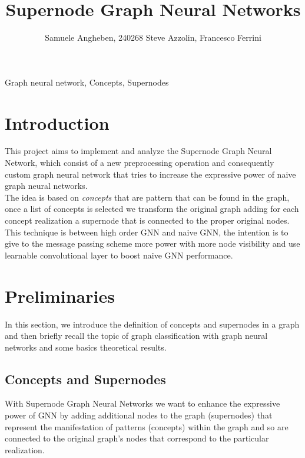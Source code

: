 \documentclass[twoside,11pt]{article}
\begin{document}
\title{Supernode Graph Neural Networks}

\author{\name Samuele Angheben, 240268
        \AND
       \name Steve Azzolin, Francesco Ferrini
   }

\maketitle

%

\begin{keywords}
  Graph neural network, Concepts, Supernodes
\end{keywords}

\section{Introduction}
This project aims to implement and analyze the Supernode Graph Neural Network, which consist of a new preprocessing operation and consequently custom graph neural network that tries to increase the expressive power of naive graph neural networks.\\
The idea is based on \textit{concepts} that are pattern that can be found in the graph, once a list of concepts is selected we transform the original graph adding for each concept realization a supernode that is connected to the proper original nodes.\\
This technique is between high order GNN and naive GNN, the intention is to give to the message passing scheme more power with more node visibility and use learnable convolutional layer to boost naive GNN performance.



\section{Preliminaries} %
\label{sec:preliminaries}
In this section, we introduce the definition of concepts and supernodes in a graph and then briefly recall the topic of graph classification with graph neural networks and some basics theoretical results.

\subsection{Concepts and Supernodes} %
\label{sub:concepts_and_supernodes}
With Supernode Graph Neural Networks we want to enhance the expressive power of GNN by adding additional nodes to the graph (supernodes) that represent the manifestation of patterns (concepts) within the graph and so are connected to the original graph's nodes that correspond to the particular realization.\\
\end{document}
